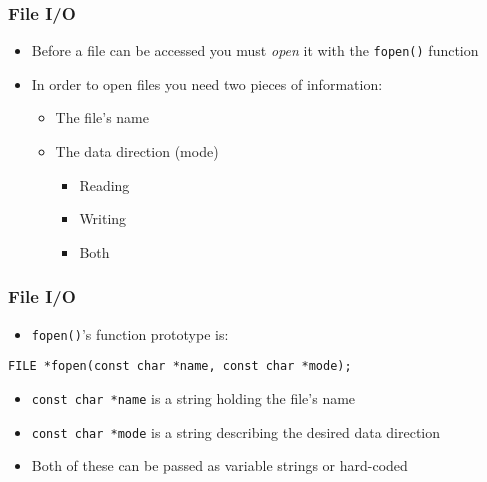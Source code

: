 \documentclass[14pt]{beamer}
\begin{document}
\begin{frame}[fragile]
\frametitle{File I/O}
\begin{itemize}
\item Before a file can be accessed you must \textit{open} it with the \texttt{fopen()} function
\item In order to open files you need two pieces of information:
	\begin{itemize}
		\item The file's name
		\item The data direction (mode)
			\begin{itemize}
				\item Reading
				\item Writing
				\item Both
			\end{itemize}
	\end{itemize}
\end{itemize}
\end{frame}

\begin{frame}[fragile]
\frametitle{File I/O}
\begin{itemize}
\item \texttt{fopen()}'s function prototype is:
\end{itemize}
\begin{lstlisting}[style=CStyle]
FILE *fopen(const char *name, const char *mode);
\end{lstlisting}
\begin{itemize}
\item \texttt{const char *name} is a string holding the file's name
\item \texttt{const char *mode} is a string describing the desired data direction
\item Both of these can be passed as variable strings or hard-coded
\end{itemize}
\end{frame}
\end{document}
